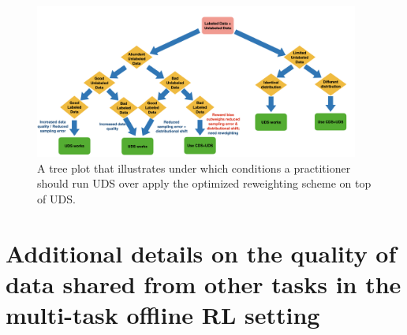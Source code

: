 \begin{figure}[ht]
    \centering
    \includegraphics[width=0.95\textwidth]{tree_plot.png}
    \vspace{-0.33cm}
    \caption{\footnotesize  A tree plot that illustrates under which conditions a practitioner should run UDS over apply the optimized reweighting scheme on top of UDS.}
    \vspace{-0.35cm}
    \label{fig:treeplot}
\end{figure}


\section{Additional details on the quality of data shared from other tasks in the multi-task offline RL setting}
\label{app:data_quality}

\begin{table}[t!]
\centering
{}
\caption{\footnotesize Success rate of the data shared from other tasks to the target task determined by the ground-truth multi-task reward function.}
\label{tbl:data_quality}
\normalsize
\end{table}


